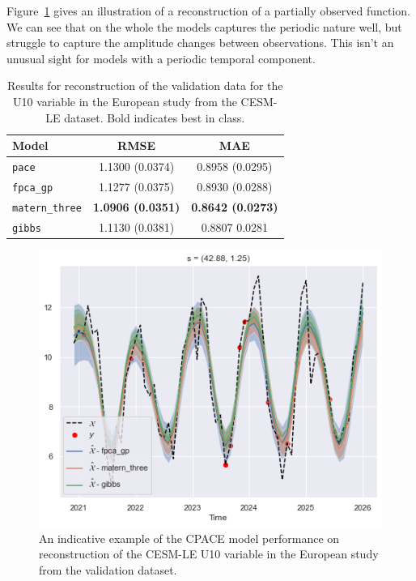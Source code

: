 Figure~\ref{fig:train_ex_u10_eur} gives an illustration of a reconstruction of a partially observed function.
We can see that on the whole the models captures the periodic nature well, but struggle to capture the amplitude changes between observations.
This isn't an unusual sight for models with a periodic temporal component.
 
\begin{table}
	\caption[Results for the U10 variable on validation data in the European study.]{Results for reconstruction of the validation data for the U10 variable in the European study from the CESM-LE dataset. Bold indicates best in class.}
	\centering
	\label{tab:train_cesm_u10_eur}
	\begin{tabular}{lcc}
		\toprule
		\textbf{Model} & \textbf{RMSE} & \textbf{MAE} \\
		\midrule
		\verb*|pace| & 1.1300 (0.0374) & 0.8958	(0.0295) \\
		\verb*|fpca_gp| & 1.1277 (0.0375) & 0.8930 (0.0288) \\
		\verb*|matern_three| & \textbf{1.0906 (0.0351)} & \textbf{0.8642 (0.0273)}\\
		\verb*|gibbs| & 1.1130 (0.0381) & 0.8807	0.0281\\
		\bottomrule
	\end{tabular}
\end{table}

\begin{figure}
	\centering
	\includegraphics[width=\textwidth]{train_ex_u10_eur}
	\caption[An indicative example of the CPACE model performance on reconstruction of the CESM-LE U10 variable in the European study from the validation dataset.]{An indicative example of the CPACE model performance on reconstruction of the CESM-LE U10 variable in the European study from the validation dataset.}
	\label{fig:train_ex_u10_eur}
\end{figure}

